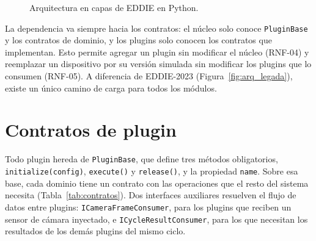 \begin{figure}[H]
\caption{Arquitectura en capas de EDDIE en Python.}
\label{fig:arquitectura}
\end{figure}

La dependencia va siempre hacia los contratos: el núcleo solo conoce \texttt{PluginBase} y los contratos de dominio, y los plugins solo conocen los contratos que implementan. Esto permite agregar un plugin sin modificar el núcleo (RNF-04) y reemplazar un dispositivo por su versión simulada sin modificar los plugins que lo consumen (RNF-05). A diferencia de EDDIE-2023 (Figura~\ref{fig:arq_legada}), existe un único camino de carga para todos los módulos.

\section{Contratos de plugin}

Todo plugin hereda de \texttt{PluginBase}, que define tres métodos obligatorios, \texttt{initialize(config)}, \texttt{execute()} y \texttt{release()}, y la propiedad \texttt{name}. Sobre esa base, cada dominio tiene un contrato con las operaciones que el resto del sistema necesita (Tabla~\ref{tab:contratos}). Dos interfaces auxiliares resuelven el flujo de datos entre plugins: \texttt{ICameraFrameConsumer}, para los plugins que reciben un sensor de cámara inyectado, e \texttt{ICycleResultConsumer}, para los que necesitan los resultados de los demás plugins del mismo ciclo.

